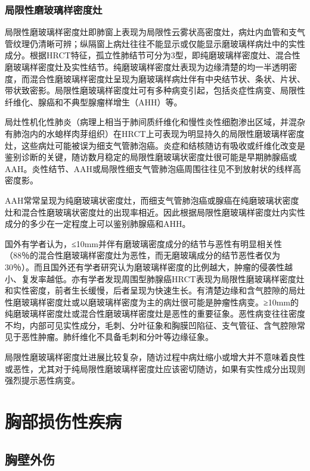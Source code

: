 \subsubsection{局限性磨玻璃样密度灶}

局限性磨玻璃样密度灶即肺窗上表现为局限性云雾状高密度灶，病灶内血管和支气管纹理仍清晰可辨；纵隔窗上病灶往往不能显示或仅能显示磨玻璃样病灶中的实性成分。根据HRCT特征，孤立性肺结节可分为3型，即纯磨玻璃样密度灶、混合性磨玻璃样密度灶及实性结节。纯磨玻璃样密度灶表现为边缘清楚的均一半透明密度，而混合性磨玻璃样密度灶呈现为磨玻璃样病灶伴有中央结节状、条状、片状、带状致密影。局限性磨玻璃样密度灶可有多种病变引起，包括炎症性病变、局限性纤维化、腺癌和不典型腺瘤样增生（AHH）等。

局灶性机化性肺炎（病理上相当于肺间质纤维化和慢性炎性细胞渗出区域，并混杂有肺泡内的水螅样肉芽组织）在HRCT上可表现为明显持久的局限性磨玻璃样密度灶，这些病灶可能被误为细支气管肺泡癌。炎症和结核随访有吸收或纤维化改变是鉴别诊断的关键，随访数月稳定的局限性磨玻璃状密度灶很可能是早期肺腺癌或AAH。炎性结节、AAH或局限性细支气管肺泡癌周围往往见不到放射状的线样高密度影。

AAH常常呈现为纯磨玻璃状密度灶，而细支气管肺泡癌或腺癌在纯磨玻璃状密度灶和混合性磨玻璃状密度灶的出现率相近。因此根据局限性磨玻璃样密度灶内实性成分的多少在一定程度上可以鉴别肺腺癌和AHH。

国外有学者认为，≤10mm并伴有磨玻璃密度成分的结节与恶性有明显相关性（88％的混合性磨玻璃样密度灶为恶性，而无磨玻璃成分的结节恶性者仅为30％）。而且国外还有学者研究认为磨玻璃样密度的比例越大，肿瘤的侵袭性越小、复发率越低。亦有学者发现周围型肺腺癌HRCT表现为局限性磨玻璃样密度灶和实性密度，前者生长缓慢，后者呈现为快速生长。有清楚边缘和含气腔隙的局灶性磨玻璃样密度灶或以磨玻璃样密度为主的病灶很可能是肿瘤性病变。≥10mm的纯磨玻璃样密度灶或混合性磨玻璃样密度灶是恶性的重要征象。恶性病变往往密度不均，内部可见实性成分，毛刺、分叶征象和胸膜凹陷征、支气管征、含气腔隙常见于恶性肿瘤。肺纤维化不具备毛刺和分叶等边缘征象。

局限性磨玻璃样密度灶进展比较复杂，随访过程中病灶缩小或增大并不意味着良性或恶性，尤其对于纯局限性磨玻璃样密度灶应该密切随访，如果有实性成分出现则强烈提示恶性病变。

\section{胸部损伤性疾病}

\subsection{胸壁外伤}

